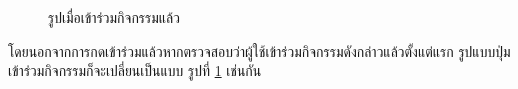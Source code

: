 \documentclass[14pt,oneside,openright,a4paper]{cpe-thai-project}
\begin{document}
\begin{figure}[H]\centering
  \setlength{\fboxrule}{0.5mm}
  \setlength{\fboxsep}{0.5cm}
  \caption{รูปเมื่อเข้าร่วมกิจกรรมแล้ว}\label{fig:16}
\end{figure}
โดยนอกจากการกดเข้าร่วมแล้วหากตรวจสอบว่าผู้ใช้เข้าร่วมกิจกรรมดังกล่าวแล้วตั้งแต่แรก รูปแบบปุ่มเข้าร่วมกิจกรรมก็จะเปลี่ยนเป็นแบบ รูปที่ \ref{fig:16}  เช่นกัน
\end{document}
